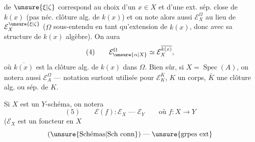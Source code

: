 de $\unsure{\xi|\zeta}$ correspond au choix d'un $x\in X$ et d'une ext. sép. close  \inserted{$\Omega$} de $k(x)$ (pas néc.  clôture alg. de $k(x)$) et on note alors aussi $\mathcal E_X^\Omega$ au lieu de $\mathcal E_X^{\unsure{\xi|\zeta}}$ ($\Omega$ sous-entendu en tant qu'extension de $k(x)$, donc avec sa structure de $k(x)$ algèbre). On aura 
\[
(4)\qquad \mathcal E_{\unsure{\alpha|X}}^\Omega\simeq\mathcal E_X^{\overline{k(x)}},
\]
où $\overline{k(x)}$ est la clôture alg. de $k(x)$ dans $\Omega$. Bien sûr, si $X=\operatorname{Spec}(A)$, on notera aussi $\mathcal E_A^\Omega$ --- notation surtout utilisée pour $\mathcal E_K^{\bar K}$, $K$ un corps, $\bar K$ une clôture alg. ou sép. de $K$.

Si $X$ est un $Y$-schéma,  on notera
\[
(5)\qquad \mathcal E(f):\mathcal E_X\mathrel{\text{---}}\mathcal E_Y\qquad\text{où }f:X\longrightarrow Y
\]
($\mathcal E_X$ est un foncteur en $X$
\[
(\unsure{\text{Schémas}|\text{Sch conn}})\mathrel{\text{---}}\unsure{\text{grpes ext}}
\]
